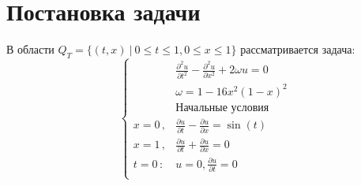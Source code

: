 \documentclass[12pt,eqnleft,executivepaper]{article}
\begin{document}
\tableofcontents
\newpage
\section{Постановка задачи}
В области $Q_T = \{(t, x) \ | \ 0 \leq t \leq 1, 0 \leq x \leq 1\}$ рассматривается задача:
\begin{equation*}
   \left\{
        \begin{aligned}
&\frac{\partial^2 u}{\partial t^2}-\frac{\partial^2 u}{\partial x^2}+2\omega u =0\\
&\omega = 1-16x^2(1-x)^2\\
&\text{Начальные условия}\\
x=0\,,&\frac{\partial u}{\partial t}-\frac{\partial u}{\partial x}= \sin(t)\\
x=1\,,&\frac{\partial u}{\partial t}+\frac{\partial u}{\partial x}= 0\\
t=0\,:& u=0, \frac{\partial u}{\partial t}=0\\
\end{aligned}\right.
\end{equation*}
\end{document}

